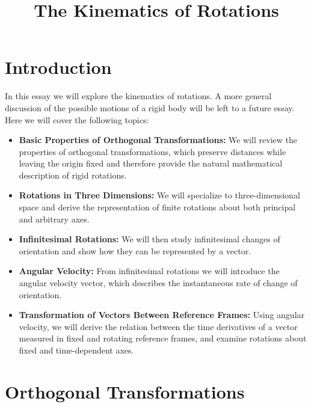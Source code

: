 \documentclass[12pt]{article}
\title{The Kinematics of Rotations}
\author{}
\date{}
\begin{document}
\maketitle

\section{Introduction}

In this essay we will explore the kinematics of rotations. A more general discussion of
the possible motions of a rigid body will be left to a future essay. Here we will cover
the following topics:

\begin{itemize}

\item \textbf{Basic Properties of Orthogonal Transformations:}
We will review the properties of orthogonal transformations, which preserve distances
while leaving the origin fixed and therefore provide the natural mathematical description
of rigid rotations.

\item \textbf{Rotations in Three Dimensions:}
We will specialize to three-dimensional space and derive the representation of finite
rotations about both principal and arbitrary axes.

\item \textbf{Infinitesimal Rotations:}
We will then study infinitesimal changes of orientation and show how they can be represented
by a vector.

\item \textbf{Angular Velocity:}
From infinitesimal rotations we will introduce the angular velocity vector, which describes
the instantaneous rate of change of orientation.

\item \textbf{Transformation of Vectors Between Reference Frames:}
Using angular velocity, we will derive the relation between the time derivatives of a vector
measured in fixed and rotating reference frames, and examine rotations about fixed and
time-dependent axes.

\end{itemize}
 
\section{Orthogonal Transformations}
\end{document}
